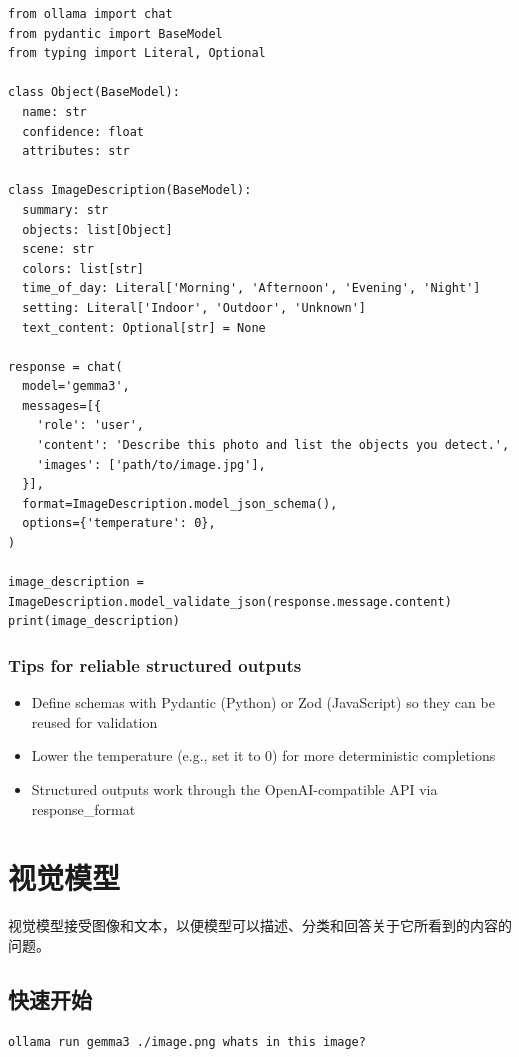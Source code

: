\documentclass[12pt,UTF8]{ctexbook}
\begin{document}
\begin{verbatim}
from ollama import chat
from pydantic import BaseModel
from typing import Literal, Optional

class Object(BaseModel):
  name: str
  confidence: float
  attributes: str

class ImageDescription(BaseModel):
  summary: str
  objects: list[Object]
  scene: str
  colors: list[str]
  time_of_day: Literal['Morning', 'Afternoon', 'Evening', 'Night']
  setting: Literal['Indoor', 'Outdoor', 'Unknown']
  text_content: Optional[str] = None

response = chat(
  model='gemma3',
  messages=[{
    'role': 'user',
    'content': 'Describe this photo and list the objects you detect.',
    'images': ['path/to/image.jpg'],
  }],
  format=ImageDescription.model_json_schema(),
  options={'temperature': 0},
)

image_description = ImageDescription.model_validate_json(response.message.content)
print(image_description)
\end{verbatim}

\subsubsection{Tips for reliable structured outputs}

\begin{itemize}
  \item Define schemas with Pydantic (Python) or Zod (JavaScript) so they can be reused for validation
  \item Lower the temperature (e.g., set it to 0) for more deterministic completions
  \item Structured outputs work through the OpenAI-compatible API via response_format
\end{itemize}

\section{视觉模型}
视觉模型接受图像和文本，以便模型可以描述、分类和回答关于它所看到的内容的问题。

\subsection{快速开始}

\begin{verbatim}
ollama run gemma3 ./image.png whats in this image?
\end{verbatim}
\end{document}
